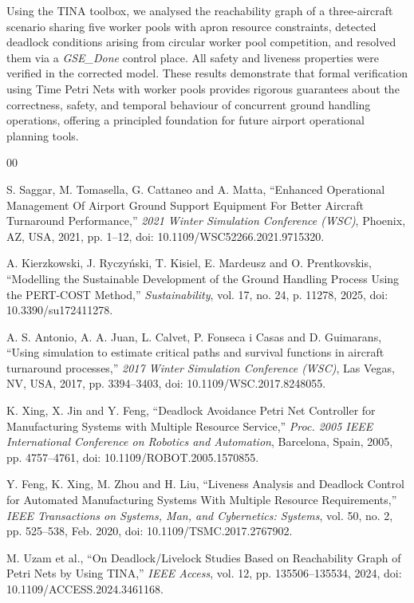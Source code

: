 \documentclass[conference]{IEEEtran}
\begin{document}
Using the TINA toolbox, we analysed the reachability graph of a three-aircraft
scenario sharing five worker pools with apron resource constraints, detected
deadlock conditions arising from circular worker pool competition, and resolved
them via a \textit{GSE\_Done} control place. All safety and liveness properties were verified in the corrected model.
These results demonstrate that formal verification using Time Petri Nets with
worker pools provides rigorous guarantees about the correctness, safety, and
temporal behaviour of concurrent ground handling operations, offering a
principled foundation for future airport operational planning tools.


\begin{thebibliography}{00}

S. Saggar, M. Tomasella, G. Cattaneo and A. Matta, ``Enhanced Operational
Management Of Airport Ground Support Equipment For Better Aircraft Turnaround
Performance,'' \textit{2021 Winter Simulation Conference (WSC)}, Phoenix, AZ,
USA, 2021, pp. 1--12, doi: 10.1109/WSC52266.2021.9715320.

A. Kierzkowski, J. Ryczyński, T. Kisiel, E. Mardeusz and O. Prentkovskis,
``Modelling the Sustainable Development of the Ground Handling Process Using
the PERT-COST Method,'' \textit{Sustainability}, vol. 17, no. 24, p. 11278,
2025, doi: 10.3390/su172411278.

A. S. Antonio, A. A. Juan, L. Calvet, P. Fonseca i Casas and D. Guimarans,
``Using simulation to estimate critical paths and survival functions in aircraft
turnaround processes,'' \textit{2017 Winter Simulation Conference (WSC)},
Las Vegas, NV, USA, 2017, pp. 3394--3403, doi: 10.1109/WSC.2017.8248055.

K. Xing, X. Jin and Y. Feng, ``Deadlock Avoidance Petri Net Controller for
Manufacturing Systems with Multiple Resource Service,'' \textit{Proc. 2005 IEEE
International Conference on Robotics and Automation}, Barcelona, Spain, 2005,
pp. 4757--4761, doi: 10.1109/ROBOT.2005.1570855.

Y. Feng, K. Xing, M. Zhou and H. Liu, ``Liveness Analysis and Deadlock Control
for Automated Manufacturing Systems With Multiple Resource Requirements,''
\textit{IEEE Transactions on Systems, Man, and Cybernetics: Systems}, vol. 50,
no. 2, pp. 525--538, Feb. 2020, doi: 10.1109/TSMC.2017.2767902.

M. Uzam et al., ``On Deadlock/Livelock Studies Based on Reachability Graph of
Petri Nets by Using TINA,'' \textit{IEEE Access}, vol. 12,
pp. 135506--135534, 2024, doi: 10.1109/ACCESS.2024.3461168.


\end{thebibliography}
\end{document}
